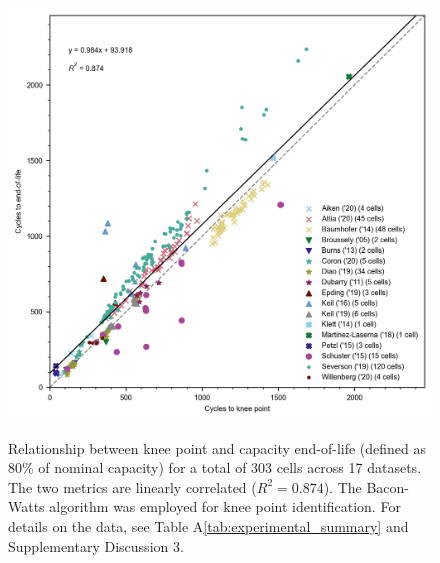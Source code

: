 \documentclass[journal=jpclcd,manuscript=article]{achemso}
\newcommand{\cmark}{\textcolor{blue}{\textrm{\ding{52}}}}%
\newcommand{\gbox}[1]{{
\fbox{
\parbox{0.8\textwidth}{  \fbox{$\triangleright$\textcolor{blue}{\textbf{Gon}:}} 
#1
}}}}
\begin{document}

\begin{figure}[!ht]
\centering
\includegraphics[scale=1.0]{figures/knee_point_eol_linear_relations}
  \label{fig:kneepoint2EOL}
\caption{Relationship between knee point and capacity end-of-life (defined as 80\% of nominal capacity) for a total of 303 cells across 17 datasets. The two metrics are linearly correlated ($R^2 = 0.874$). The Bacon-Watts algorithm was employed for knee point identification. For details on the data, see Table A\ref{tab:experimental_summary} and Supplementary Discussion 3.}
\label{fig:knees2EOL}
\end{figure}
\end{document}
